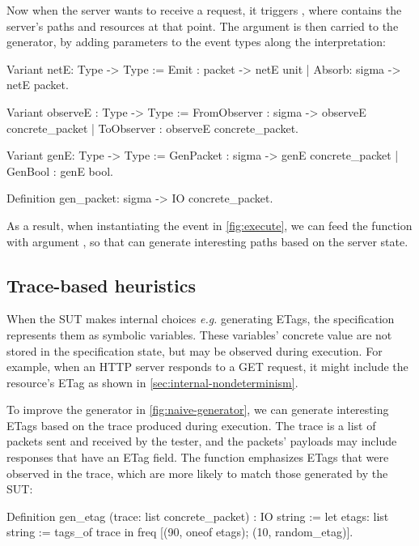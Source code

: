 Now when the server wants to receive a request, it triggers ,
where  contains the server's paths and resources at that
point.  The  argument is then carried to the generator, by adding
parameters to the event types along the interpretation:
\begin{coq}
  Variant netE: Type -> Type :=
    Emit  : packet -> netE unit
  | Absorb: sigma      -> netE packet.

  Variant observeE : Type -> Type :=
    FromObserver   : sigma -> observeE concrete_packet
  | ToObserver     : observeE concrete_packet.

  Variant genE: Type -> Type :=
    GenPacket : sigma -> genE concrete_packet
  | GenBool   : genE bool.

  Definition gen_packet: sigma -> IO concrete_packet.
\end{coq}

As a result, when instantiating the  event in
\autoref{fig:execute}, we can feed the  function with argument
, so that  can generate interesting paths based on the
server state.

\subsection{Trace-based heuristics}
\label{sec:heuristic-trace}

When the SUT makes internal choices {\it e.g.} generating ETags, the
specification represents them as symbolic variables.  These variables' concrete
value are not stored in the specification state, but may be observed during
execution.  For example, when an HTTP server responds to a GET request, it might
include the resource's ETag as shown in \autoref{sec:internal-nondeterminism}.

To improve the generator in \autoref{fig:naive-generator}, we can generate
interesting ETags based on the trace produced during execution.  The trace is a
list of packets sent and received by the tester, and the packets' payloads may
include responses that have an ETag field.  The  function
emphasizes ETags that were observed in the trace, which are more likely to match
those generated by the SUT:
\begin{coq}
  Definition gen_etag (trace: list concrete_packet) : IO string :=
    let etags: list string := tags_of trace in
    freq [(90, oneof etags);
          (10, random_etag)].
\end{coq}

